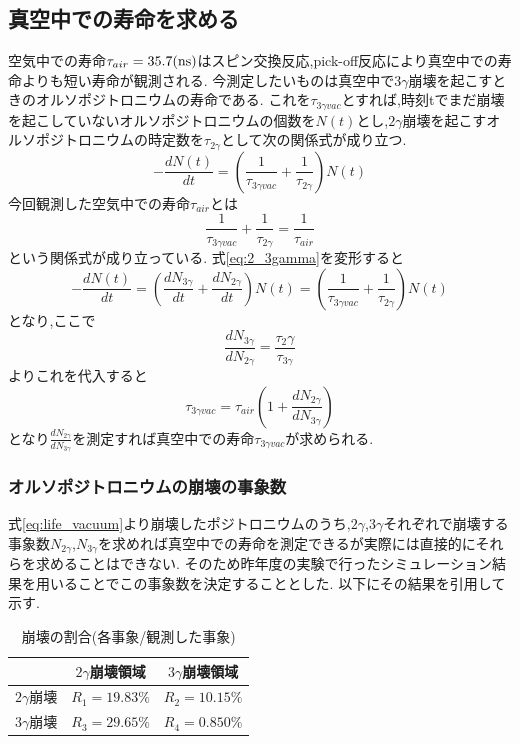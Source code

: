 \subsection{真空中での寿命を求める}
空気中での寿命$\tau_{air}=35.7(\rm ns)$はスピン交換反応,pick-off反応により真空中での寿命よりも短い寿命が観測される.
今測定したいものは真空中で$3\gamma$崩壊を起こすときのオルソポジトロニウムの寿命である.
これを$\tau_{3\gamma vac}$とすれば,時刻tでまだ崩壊を起こしていないオルソポジトロニウムの個数を$N(t)$とし,$2\gamma$崩壊を起こすオルソポジトロニウムの時定数を$\tau_{2\gamma}$として次の関係式が成り立つ.
\begin{equation}
	-\frac{dN(t)}{dt}=\left(\frac{1}{\tau_{3\gamma vac}}+\frac{1}{\tau_{2\gamma}}\right)N(t)
	\label{eq:2_3gamma}
\end{equation}
今回観測した空気中での寿命$\tau_{air}$とは
\begin{equation}
	\frac{1}{\tau_{3\gamma vac}}+\frac{1}{\tau_{2\gamma}}=\frac{1}{\tau_{air}}
\end{equation}
という関係式が成り立っている.
式\ref{eq:2_3gamma}を変形すると
\begin{equation}
	-\frac{dN(t)}{dt}=\left(\frac{dN_{3\gamma}}{dt}+\frac{dN_{2\gamma}}{dt}\right)N(t)=\left(\frac{1}{\tau_{3\gamma vac}}+\frac{1}{\tau_{2\gamma}}\right)N(t)
\end{equation}
となり,ここで
\begin{equation}
	\frac{dN_{3\gamma}}{dN_{2\gamma}}=\frac{\tau_2\gamma}{\tau_{3\gamma}}
\end{equation}
よりこれを代入すると
\begin{equation}
	\tau_{3\gamma vac}=\tau_{air}\left(1+\frac{dN_{2\gamma}}{dN_{3\gamma}}\right)
	\label{eq:life_vacuum}
\end{equation}
となり$\frac{dN_{2\gamma}}{dN_{3\gamma}}$を測定すれば真空中での寿命$\tau_{3\gamma vac}$が求められる.

\subsubsection{オルソポジトロニウムの崩壊の事象数}
式\ref{eq:life_vacuum}より崩壊したポジトロニウムのうち,$2\gamma$,$3\gamma$それぞれで崩壊する事象数$N_{2\gamma}$,$N_{3\gamma}$を求めれば真空中での寿命を測定できるが実際には直接的にそれらを求めることはできない.
そのため昨年度の実験で行ったシミュレーション結果を用いることでこの事象数を決定することとした.
以下にその結果を引用して示す.
\begin{table}[htbp]
	\begin{center}
		\caption{崩壊の割合(各事象/観測した事象)}
		\begin{tabular}{|l|c|c|} \hline
			& $2\gamma$崩壊領域 & $3\gamma$崩壊領域 \\ \hline
			$2\gamma$崩壊 & $R_1=19.83\%$ & $R_2=10.15\%$\\
			$3\gamma$崩壊 & $R_3=29.65\%$ & $R_4=0.850\%$\\ \hline
		\end{tabular}
		\label{2_3gamma_ratio}
	\end{center}
\end{table}

